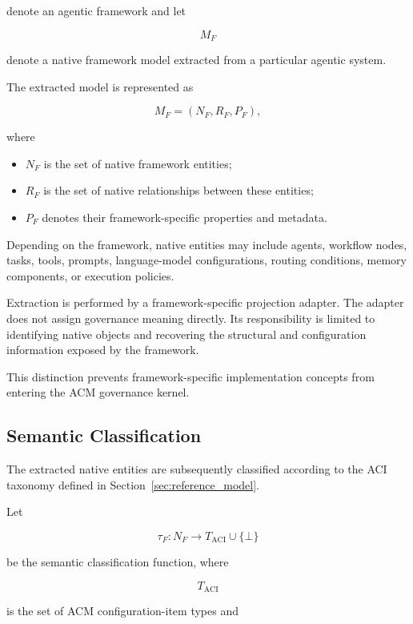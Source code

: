 \documentclass[10pt]{article}
\begin{document}
denote an agentic framework and let

\[
M_F
\]

denote a native framework model extracted from a particular agentic system.

The extracted model is represented as

\begin{equation}
M_F=(N_F,R_F,P_F),
\label{eq:M_equality}
\end{equation}

where

\begin{itemize}
	\item $N_F$ is the set of native framework entities;
	\item $R_F$ is the set of native relationships between these entities;
	\item $P_F$ denotes their framework-specific properties and metadata.
\end{itemize}

Depending on the framework, native entities may include agents, workflow nodes, tasks, tools, prompts, language-model configurations, routing conditions, memory components, or execution policies.

Extraction is performed by a framework-specific projection adapter. The adapter does not assign governance meaning directly. Its responsibility is limited to identifying native objects and recovering the structural and configuration information exposed by the framework.

This distinction prevents framework-specific implementation concepts from entering the ACM governance kernel.

\subsection{Semantic Classification}

The extracted native entities are subsequently classified according to the ACI taxonomy defined in Section~\ref{sec:reference_model}.

Let

\[
\tau_F :
N_F
\rightarrow
T_{\mathrm{ACI}}
\cup
\{\bot\}
\]

be the semantic classification function, where

\[
T_{\mathrm{ACI}}
\]

is the set of ACM configuration-item types and
\end{document}
